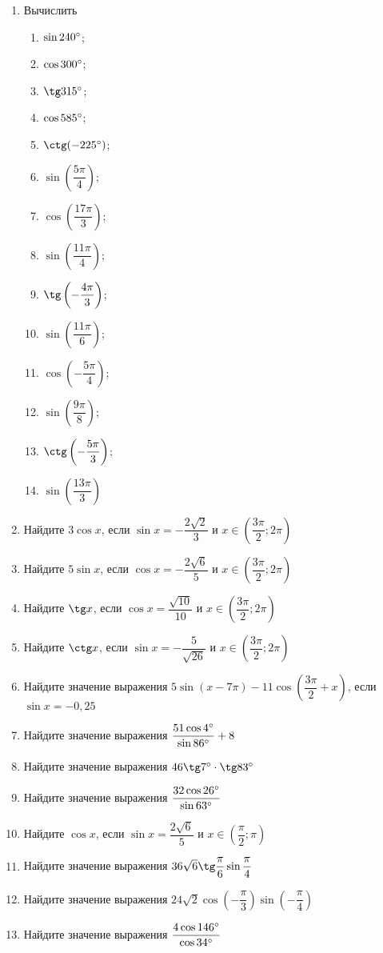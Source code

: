 \documentclass[12pt, a4paper]{article}
\begin{document}
	

\begin{enumerate}
	\item Вычислить
	\begin{multicols}{4}
		\begin{enumerate}[label=\asbuk*)]
			\item $\sin240\degree$; 
			\item $\cos300\degree$; 
			\item $\tg315\degree$; 
			\item $\cos585\degree$; 
			\item $\ctg(-225\degree)$; 
			\item $\sin\left(\dfrac{5\pi}{4}\right)$; 
			\item $\cos\left(\dfrac{17\pi}{3}\right)$; 
			\item $\sin\left(\dfrac{11\pi}{4}\right)$; 
			\item $\tg\left(-\dfrac{4\pi}{3}\right)$; 
			\item $\sin\left(\dfrac{11\pi}{6}\right)$; 
			\item $\cos\left(-\dfrac{5\pi}{4}\right)$;
			\item $\sin\left(\dfrac{9\pi}{8}\right)$;
			\item $\ctg\left(-\dfrac{5\pi}{3}\right)$;
			\item $\sin\left(\dfrac{13\pi}{3}\right)$
		\end{enumerate}
	\end{multicols}
	\item Найдите $3\cos x$, если $\sin x=-\dfrac{2\sqrt{2}}{3}$ и $x \in \left(\dfrac{3\pi}{2};2\pi\right)$
	\item Найдите $5\sin x$, если $\cos x=-\dfrac{2\sqrt{6}}{5}$ и $x \in \left(\dfrac{3\pi}{2};2\pi\right)$
	\item Найдите $\tg x$, если $\cos x=\dfrac{\sqrt{10}}{10}$ и $x \in \left(\dfrac{3\pi}{2};2\pi\right)$
	\item Найдите $\ctg x$, если $\sin x=-\dfrac{5}{\sqrt{26}}$ и $x \in \left(\dfrac{3\pi}{2};2\pi\right)$
	\item Найдите значение выражения $5\sin(x-7\pi)-11\cos\left(\dfrac{3\pi}{2}+x\right)$, если $\sin x = -0,25$
	\item Найдите значение выражения $\dfrac{51\cos4\degree}{\sin86\degree}+8$
	\item Найдите значение выражения $46\tg7\degree\cdot\tg83\degree$
	\item Найдите значение выражения $\dfrac{32\cos26\degree}{\sin63\degree}$
	\item Найдите $\cos x$, если $\sin x=\dfrac{2\sqrt{6}}{5}$ и $x \in \left(\dfrac{\pi}{2};\pi\right)$
	\item Найдите значение выражения $36\sqrt{6}\tg\dfrac{\pi}{6}\sin\dfrac{\pi}{4}$
	\item Найдите значение выражения $24\sqrt{2}\cos\left(-\dfrac{\pi}{3}\right)\sin\left(-\dfrac{\pi}{4}\right)$
	\item Найдите значение выражения $\dfrac{4\cos146\degree}{\cos34\degree}$
\end{enumerate}
	
\end{document}
